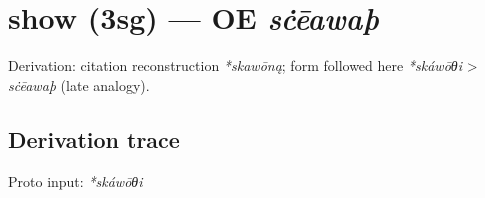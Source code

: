 \documentclass[
  british,
  a4paper,
  openany]{book}
\providecommand{\texorpdfstring}[2]{#1}
\begin{document}
\section{\texorpdfstring{show (3sg) --- OE
\emph{sċēawaþ}}{show (3sg) --- OE sċēawaþ}}\label{show-3sg-oe-sux10bux113awauxfe}


Derivation: citation reconstruction \emph{*skawōną}; form followed here
\emph{*skáwōθi} \textgreater{} \emph{sċēawaþ} (late analogy).

\subsection{Derivation trace}\label{derivation-trace-135}

Proto input: \emph{*skáwōθi}

\begingroup
\setlength{\fboxsep}{6pt}
\end{document}
